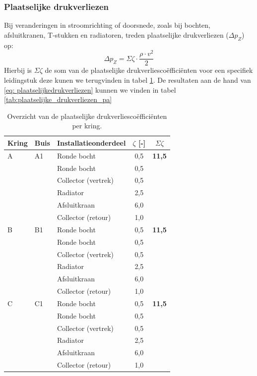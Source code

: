 \documentclass[a4paper,12pt]{article}
\begin{document}
\subsubsection{Plaatselijke drukverliezen}
Bij veranderingen in stroomrichting of doorsnede, zoals bij bochten, afsluitkranen, T-stukken en radiatoren, treden plaatselijke drukverliezen ($\Delta p_Z$) op:
\begin{equation}
    \Delta p_Z = \Sigma\zeta \cdot \frac{\rho \cdot v^2}{2}
    \label{eq: plaatselijkedrukverliezen}
\end{equation}
Hierbij is $\Sigma\zeta$ de som van de plaatselijke drukverliescoëfficiënten voor een specifiek leidingstuk deze kunen we terugvinden in tabel \ref{tab:plaatselijke_drukverliezen}. De resultaten aan de hand van \ref{eq: plaatselijkedrukverliezen} kunnen we vinden in tabel \ref{tab:plaatselijke_drukverliezen_pa}

\begin{table}[!ht]
    \centering
    \caption{Overzicht van de plaatselijke drukverliescoëfficiënten per kring.}
    \label{tab:plaatselijke_drukverliezen}
    \begin{tabularx}{\textwidth}{l l X c c}
        \toprule
        \rowcolor{gray!20}
        \textbf{Kring} & \textbf{Buis} & \textbf{Installatieonderdeel} & \textbf{$\zeta$ [-]} & \textbf{$\Sigma \zeta$} \\
        \midrule
        A & A1 & Ronde bocht & 0,5 & \textbf{11,5} \\
        ~ & ~  & Ronde bocht & 0,5 & ~ \\
        ~ & ~  & Collector (vertrek) & 0,5 & ~ \\
        ~ & ~  & Radiator & 2,5 & ~ \\
        ~ & ~  & Afsluitkraan & 6,0 & ~ \\
        ~ & ~  & Collector (retour) & 1,0 & ~ \\
        \midrule
        B & B1 & Ronde bocht & 0,5 & \textbf{11,5} \\
        ~ & ~  & Ronde bocht & 0,5 & ~ \\
        ~ & ~  & Collector (vertrek) & 0,5 & ~ \\
        ~ & ~  & Radiator & 2,5 & ~ \\
        ~ & ~  & Afsluitkraan & 6,0 & ~ \\
        ~ & ~  & Collector (retour) & 1,0 & ~ \\
        \midrule
        C & C1 & Ronde bocht & 0,5 & \textbf{11,5} \\
        ~ & ~  & Ronde bocht & 0,5 & ~ \\
        ~ & ~  & Collector (vertrek) & 0,5 & ~ \\
        ~ & ~  & Radiator & 2,5 & ~ \\
        ~ & ~  & Afsluitkraan & 6,0 & ~ \\
        ~ & ~  & Collector (retour) & 1,0 & ~ \\
        \bottomrule
    \end{tabularx}
\end{table}
\end{document}
